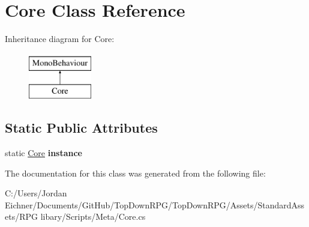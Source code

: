 \hypertarget{class_core}{}\section{Core Class Reference}
\label{class_core}
Inheritance diagram for Core\+:\begin{figure}[H]
\begin{center}
\leavevmode
\includegraphics[height=2.000000cm]{class_core}
\end{center}
\end{figure}
\subsection*{Static Public Attributes}
\begin{DoxyCompactItemize}
\item 
\hypertarget{class_core_add8b471228af83cbf0723baefade84ea}{}static \hyperlink{class_core}{Core} {\bfseries instance}\label{class_core_add8b471228af83cbf0723baefade84ea}

\end{DoxyCompactItemize}


The documentation for this class was generated from the following file\+:\begin{DoxyCompactItemize}
\item 
C\+:/\+Users/\+Jordan Eichner/\+Documents/\+Git\+Hub/\+Top\+Down\+R\+P\+G/\+Top\+Down\+R\+P\+G/\+Assets/\+Standard\+Assets/\+R\+P\+G libary/\+Scripts/\+Meta/Core.\+cs\end{DoxyCompactItemize}
